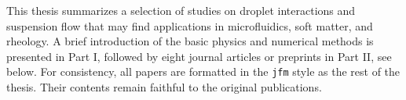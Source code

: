 %
\begin{preface}
	This thesis summarizes a selection of studies on droplet interactions and suspension flow
        that may find applications in microfluidics, soft matter, and rheology.
        A brief introduction of the basic physics and numerical methods is presented in Part I,
        followed by eight journal articles or preprints in Part II, see below.
        For consistency, all papers are formatted in the \texttt{jfm} style as the rest of the thesis.
        Their contents remain faithful to the original publications.
\end{preface}


%
